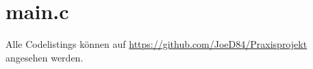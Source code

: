 \section{main.c}
\label{sec:main.c}
Alle Codelistings können auf \url{https://github.com/JoeD84/Praxisprojekt} angesehen werden.
%
%
%
